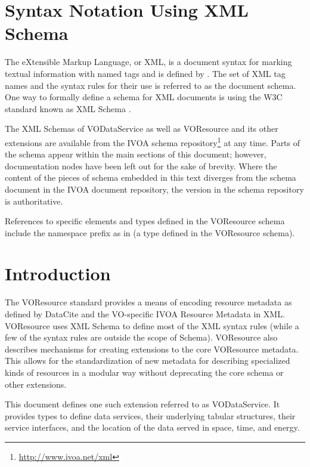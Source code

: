 \documentclass[11pt,a4paper]{ivoa}
\begin{document}
\section*{Syntax Notation Using XML Schema}

The eXtensible Markup Language, or XML, is a document syntax for marking
textual information with named tags and is defined by \citet{std:XML}.
The set of XML tag names and the syntax
rules for their use is referred to as the document schema.  One way to
formally define a schema for XML documents is using the W3C standard
known as XML Schema \citep{std:XSD}.

The XML Schemas of VODataService as well as VOResource and its other
extensions are
available from the IVOA schema
repository\footnote{\url{http://www.ivoa.net/xml}} at any time.
Parts of the schema appear within the main sections of this document;
however, documentation nodes have been left out for the sake of brevity.
Where the content of the pieces of schema embedded in this text
diverges from the schema document in the IVOA document
repository, the version in the schema repository is authoritative.

References to specific elements and types defined in the VOResource
schema include the namespace prefix  as in
 (a type defined in the VOResource schema).

\section{Introduction}

The VOResource standard \citep{2018ivoa.spec.0625P} provides a means of
encoding resource metadata as defined by DataCite \citep{std:DataCite40}
and the VO-specific IVOA Resource Metadata \citep{2007ivoa.spec.0302H} in XML.
VOResource uses XML Schema \citep{std:XSD} to define
most of the XML syntax rules (while a few of the syntax rules are
outside the scope of Schema).  VOResource also describes mechanisms
for creating extensions to the core VOResource metadata.  This allows
for the standardization of new metadata for describing specialized
kinds of resources in a modular way without deprecating the core
schema or other extensions.

This document defines one such extension referred to as VODataService.
It provides types to define data services, their underlying tabular
structures, their service interfaces, and the location of the data
served in space, time, and energy.
\end{document}
